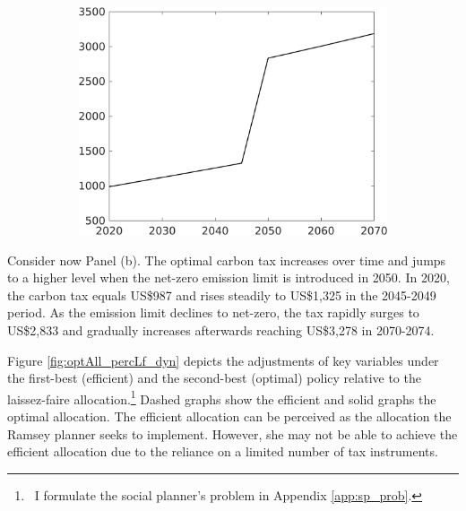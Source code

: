 \begin{figure}[h!!]
\begin{subfigure}{0.4\textwidth}
		\includegraphics[width=1\textwidth]{../../codding_model/own_basedOnFried/optimalPol_010922_revision/figures/all_13Sept22_Tplus30/Single_periods12_OPT_T_NoTaus_Tauf_regime4_spillover0_knspil0_noskill0_sep0_xgrowth0_extern0_PV1_sizeequ0_GOV0_etaa0.79.png}
	\end{subfigure}
\end{figure} 
Consider now Panel (b). The optimal carbon tax increases over time and jumps to a higher level when the net-zero emission limit is introduced in 2050.
In 2020, the carbon tax equals US\$987 and rises steadily to US\$1,325 in the 2045-2049 period.  As the emission limit declines to net-zero, the tax rapidly surges to US\$2,833 and gradually increases afterwards reaching US\$3,278 in 2070-2074. 

Figure \ref{fig:optAll_percLf_dyn} depicts the adjustments of key variables under the first-best (efficient) and the second-best (optimal) policy relative to the laissez-faire allocation.\footnote{\ I formulate the social planner's problem in Appendix \ref{app:sp_prob}. }  Dashed graphs show the efficient and solid graphs the optimal allocation.
The efficient allocation can be perceived as the allocation the Ramsey planner seeks to implement. However, she may not be able to achieve the efficient allocation due to the reliance on a limited number of tax instruments.

